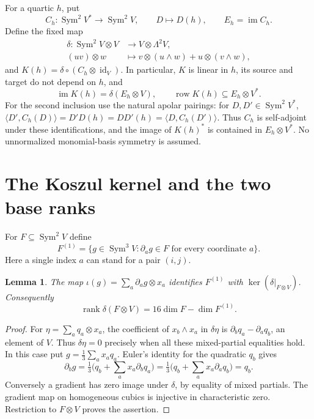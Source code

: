 \documentclass[11pt]{article}
\newtheorem{lemma}[theorem]{Lemma}
\theoremstyle{remark}
\newcommand{\Sym}{\operatorname{Sym}}
\newcommand{\rank}{\operatorname{rank}}
\newcommand{\im}{\operatorname{im}}
\newcommand{\row}{\operatorname{row}}
\newcommand{\id}{\operatorname{id}}
\newcommand{\dd}{\partial}
\begin{document}
For a quartic $h$, put
\[
 C_h:\Sym^2V^*\longrightarrow\Sym^2V,\qquad D\longmapsto D(h),
 \qquad E_h=\im C_h.
\]
Define the fixed map
\begin{align*}
 \delta:\Sym^2V\otimes V&\longrightarrow V\otimes\Lambda^2 V,\\
 (uv)\otimes w&\longmapsto v\otimes(u\wedge w)+u\otimes(v\wedge w),
\end{align*}
and $K(h)=\delta\circ(C_h\otimes\id_V)$. In particular, $K$ is linear in
$h$, its source and target do not depend on $h$, and
\begin{equation}\label{eq:image-row}
 \im K(h)=\delta(E_h\otimes V),\qquad
 \row K(h)\subseteq E_h\otimes V^*.
\end{equation}
For the second inclusion use the natural apolar pairings: for
$D,D'\in\Sym^2V^*$,
$\langle D',C_h(D)\rangle=D'D(h)=DD'(h)=\langle D,C_h(D')\rangle$.
Thus $C_h$ is self-adjoint under these identifications, and the image of
$K(h)^*$ is contained in $E_h\otimes V^*$.
No unnormalized monomial-basis symmetry is assumed.

\section{The Koszul kernel and the two base ranks}
For $F\subseteq\Sym^2V$ define
\[
 F^{(1)}=\{g\in\Sym^3V:\dd_a g\in F\text{ for every coordinate }a\}.
\]
Here a single index $a$ can stand for a pair $(i,j)$.
\begin{lemma}\label{lem:gradient}
The map $\iota(g)=\sum_a\dd_a g\otimes x_a$ identifies $F^{(1)}$ with
$\ker(\delta|_{F\otimes V})$. Consequently
\[
 \rank\delta(F\otimes V)=16\dim F-\dim F^{(1)}.
\]
\end{lemma}
\begin{proof}
For $\eta=\sum_a q_a\otimes x_a$, the coefficient of $x_b\wedge x_a$
in $\delta\eta$ is $\dd_bq_a-\dd_aq_b$, an element of $V$. Thus
$\delta\eta=0$ precisely when all these mixed-partial equalities hold.
In this case put $g=\frac13\sum_a x_aq_a$. Euler's identity for the
quadratic $q_b$ gives
\[
 \dd_b g=\tfrac13\bigl(q_b+\sum_a x_a\dd_bq_a\bigr)
 =\tfrac13\bigl(q_b+\sum_a x_a\dd_aq_b\bigr)=q_b.
\]
Conversely a gradient has zero image under $\delta$, by equality of mixed
partials. The gradient map on homogeneous cubics is injective in
characteristic zero. Restriction to $F\otimes V$ proves the assertion.
\end{proof}
\end{document}
